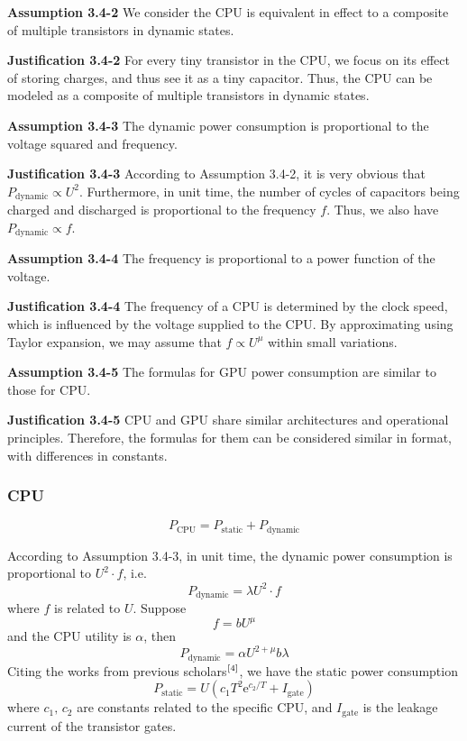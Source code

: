 \documentclass[12pt]{article}
\begin{document}
\noindent \textbf{Assumption 3.4-2} \quad We consider the CPU is equivalent in effect to a composite of multiple transistors in dynamic states.

\noindent \textbf{Justification 3.4-2} \quad For every tiny transistor in the CPU, we focus on its effect of storing charges, and thus see it as a tiny capacitor. Thus, the CPU can be modeled as a composite of multiple transistors in dynamic states.

\noindent \textbf{Assumption 3.4-3} \quad The dynamic power consumption is proportional to the voltage squared and frequency.

\noindent \textbf{Justification 3.4-3} \quad According to Assumption 3.4-2, it is very obvious that $P_\mathrm{dynamic}\propto U^2$. Furthermore, in unit time, the number of cycles of capacitors being charged and discharged is proportional to the frequency $f$. Thus, we also have $P_\mathrm{dynamic}\propto f$. 

\noindent \textbf{Assumption 3.4-4} \quad The frequency is proportional to a power function of the voltage.

\noindent \textbf{Justification 3.4-4} \quad The frequency of a CPU is determined by the clock speed, which is influenced by the voltage supplied to the CPU. By approximating using Taylor expansion, we may assume that $f\propto U^\mu$ within small variations.

\noindent \textbf{Assumption 3.4-5} \quad The formulas for GPU power consumption are similar to those for CPU.

\noindent \textbf{Justification 3.4-5} \quad CPU and GPU share similar architectures and operational principles. Therefore, the formulas for them can be considered similar in format, with differences in constants.

\subsubsection{CPU}

\begin{equation}
	P_\mathrm{CPU}=P_\mathrm{static}+P_\mathrm{dynamic}
\end{equation}

According to Assumption 3.4-3, in unit time, the dynamic power consumption is proportional to $U^2\cdot f$, i.e.
\begin{equation}
	P_\mathrm{dynamic}=\lambda U^2\cdot f
\end{equation}
where $f$ is related to $U$. Suppose 
\begin{equation}
	f=b U^\mu
\end{equation}
and the CPU utility is $\alpha$, then
\begin{equation}
	P_\mathrm{dynamic}=\alpha U^{2+\mu}b\lambda
\end{equation}
Citing the works from previous scholars$\rm ^{[4]}$, we have the static power consumption
\begin{equation}
	P_\mathrm{static}=U\left(c_1T^2\mathrm e^{c_2/T}+I_\mathrm{gate}\right)
\end{equation}
where $c_1,\,c_2$ are constants related to the specific CPU, and $I_\mathrm{gate}$ is the leakage current of the transistor gates.
\end{document}
